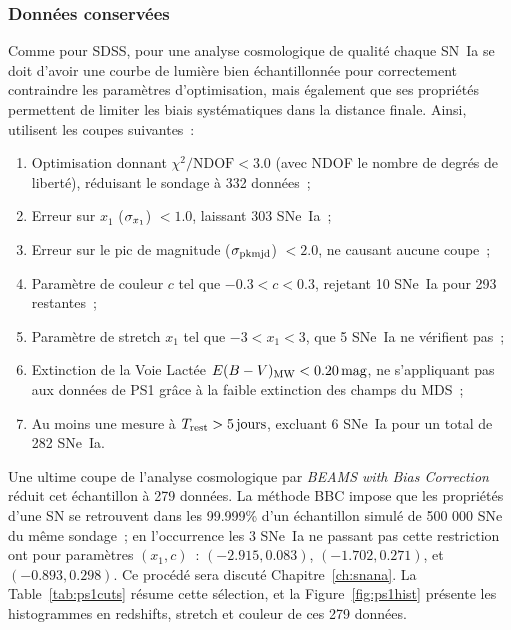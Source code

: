 \documentclass[../main/main.tex]{subfiles}
\begin{document}
\subsubsection{Données conservées}\label{ssec:ps1data}

Comme pour SDSS, pour une analyse cosmologique de qualité chaque SN~Ia se doit
d'avoir une courbe de lumière bien échantillonnée pour correctement contraindre
les paramètres d'optimisation, mais également que ses propriétés permettent de
limiter les biais systématiques dans la distance finale.
Ainsi,~\cite{scolnic2018} utilisent les coupes suivantes~:
\begin{enumerate}
    \item Optimisation donnant $\chi^2/\mathrm{NDOF} < 3.0$ (avec NDOF le nombre
        de degrés de liberté), réduisant le sondage à 332 données~;
    \item Erreur sur $x_1$ ($\sigma_{x_1}$) $< 1.0$, laissant 303 SNe~Ia~;
    \item Erreur sur le pic de magnitude ($\sigma_{\rm pkmjd}$) $< 2.0$, ne causant
        aucune coupe~;
    \item Paramètre de couleur $c$ tel que $-0.3 < c < 0.3$, rejetant 10 SNe~Ia
        pour 293 restantes~;
    \item Paramètre de stretch $x_1$ tel que $-3 < x_1 < 3$, que 5 SNe~Ia ne
        vérifient pas~;
    \item Extinction de la Voie Lactée $E(B-V)_{\rm MW}< \SI{0.20}{mag}$, ne
        s'appliquant pas aux données de PS1 grâce à la faible extinction des
        champs du MDS~;
    \item Au moins une mesure à $T_{\rm rest} > \SI{5}{jours}$, excluant 6
        SNe~Ia pour un total de 282 SNe~Ia.
\end{enumerate}
Une ultime coupe de l'analyse cosmologique par \textit{BEAMS with Bias
Correction}~\citep[BBC,][]{kessler2017} réduit cet échantillon à 279 données. La
méthode BBC impose que les propriétés d'une SN se retrouvent dans les 99.999\%
d'un échantillon simulé de 500 000 SNe du même sondage~; en l'occurrence les 3
SNe~Ia ne passant pas cette restriction ont pour paramètres $(x_1,c)$~:
$(−2.915, 0.083)$, $(−1.702, 0.271)$, et $(−0.893, 0.298)$. Ce procédé sera
discuté Chapitre~\ref{ch:snana}. La Table~\ref{tab:ps1cuts} résume cette
sélection, et la Figure~\ref{fig:ps1hist} présente les histogrammes en
redshifts, stretch et couleur de ces 279 données.
\end{document}
